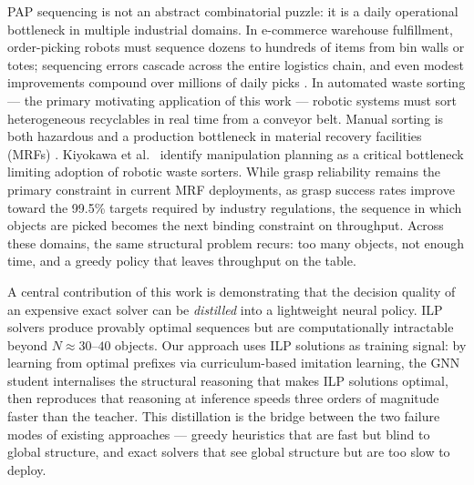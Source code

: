 \documentclass[conference]{IEEEtran}
\begin{document}
PAP sequencing is not an abstract combinatorial puzzle: it is a daily operational bottleneck in multiple industrial domains. In e-commerce warehouse fulfillment, order-picking robots must sequence dozens to hundreds of items from bin walls or totes; sequencing errors cascade across the entire logistics chain, and even modest improvements compound over millions of daily picks \cite{cheng2024drl}. In automated waste sorting --- the primary motivating application of this work --- robotic systems must sort heterogeneous recyclables in real time from a conveyor belt. Manual sorting is both hazardous and a production bottleneck in material recovery facilities (MRFs) \cite{gundupalli2020sequence}. Kiyokawa et al.\ \cite{kiyokawa2024challenges} identify manipulation planning as a critical bottleneck limiting adoption of robotic waste sorters. While grasp reliability remains the primary constraint in current MRF deployments, as grasp success rates improve toward the 99.5\% targets required by industry regulations, the sequence in which objects are picked becomes the next binding constraint on throughput. Across these domains, the same structural problem recurs: too many objects, not enough time, and a greedy policy that leaves throughput on the table.

A central contribution of this work is demonstrating that the decision quality of an expensive exact solver can be \emph{distilled} into a lightweight neural policy. ILP solvers produce provably optimal sequences but are computationally intractable beyond $N \approx 30$--$40$ objects. Our approach uses ILP solutions as training signal: by learning from optimal prefixes via curriculum-based imitation learning, the GNN student internalises the structural reasoning that makes ILP solutions optimal, then reproduces that reasoning at inference speeds three orders of magnitude faster than the teacher. This distillation is the bridge between the two failure modes of existing approaches --- greedy heuristics that are fast but blind to global structure, and exact solvers that see global structure but are too slow to deploy.
\end{document}

